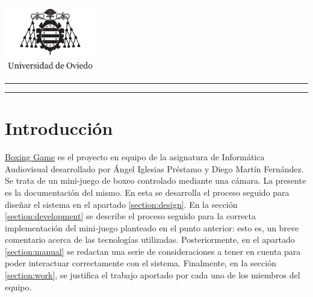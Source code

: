 \documentclass{article}
\begin{document}
\newcommand{\HRule}{\rule{\linewidth}{0.5mm}}
\begin{titlepage}
    \centering
    \includegraphics[width=0.3\textwidth]{img/uniovi}
    \vfill
    \HRule
    \vspace{0.4cm}
    {\huge\bfseries\titulo\par}
    \vspace{1.5cm}
    {\Large\itshape\autorAngel\par\vspace{0.1cm}\autorDiego\par}
    \vspace{0.4cm}
    \HRule
    \vspace{1.5cm}
    {\LARGE\escuela\par}
    \vspace{0.5cm}
    {\Large\asignatura\par}
    \vfill
    {\large\universidad\par}
    \fecha
    \vfill
\end{titlepage}

\thispagestyle{empty}
\renewcommand{\contentsname}{Tabla de contenidos}
\tableofcontents{}
\newpage
\setcounter{page}{1}


\section{Introducción}

\href{https://angelip2303.github.io/boxing-docs/}{Boxing Game} es el proyecto en equipo de la asignatura de Informática Audiovisual desarrollado por Ángel Iglesias Préstamo y Diego Martín Fernández. Se trata de un mini-juego de boxeo controlado mediante una cámara. La presente es la documentación del mismo. En esta se desarrolla el proceso seguido para diseñar el sistema en el apartado \ref{section:design}. En la sección \ref{section:development} se describe el proceso seguido para la correcta implementación del mini-juego planteado en el punto anterior: esto es, un breve comentario acerca de las tecnologías utilizadas. Posteriormente, en el apartado \ref{section:manual} se redactan una serie de consideraciones a tener en cuenta para poder interactuar correctamente con el sistema. Finalmente, en la sección \ref{section:work}, se justifica el trabajo aportado por cada uno de los miembros del equipo.
\end{document}
